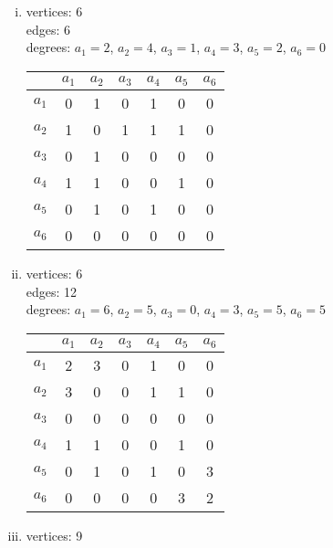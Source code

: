 \documentclass{article}
\begin{document}
\section{}
\begin{enumerate}[i)]
\item
vertices: 6\\
edges: 6\\
degrees: $a_1=2$, $a_2=4$, $a_3=1$, $a_4=3$, $a_5=2$, $a_6=0$
\begin{table}[!h]
\begin{center}
\begin{tabular}{c|cccccc}
	 &$a_1$&$a_2$&$a_3$&$a_4$&$a_5$&$a_6$\\ \hline
$a_1$&	0  &  1  &  0  &  1  &  0  &  0  \\
$a_2$&	1  &  0  &  1  &  1  &  1  &  0  \\
$a_3$&	0  &  1  &  0  &  0  &  0  &  0  \\
$a_4$&	1  &  1  &  0  &  0  &  1  &  0  \\
$a_5$&	0  &  1  &  0  &  1  &  0  &  0  \\
$a_6$&	0  &  0  &  0  &  0  &  0  &  0  \\
\end{tabular}
\end{center}
\end{table}
\newpage
\item
vertices: 6\\
edges: 12\\
degrees: $a_1=6$, $a_2=5$, $a_3=0$, $a_4=3$, $a_5=5$, $a_6=5$
\begin{table}[!h]
\begin{center}
\begin{tabular}{c|cccccc}
	 &$a_1$&$a_2$&$a_3$&$a_4$&$a_5$&$a_6$\\ \hline
$a_1$&	2  &  3  &  0  &  1  &  0  &  0  \\
$a_2$&	3  &  0  &  0  &  1  &  1  &  0  \\
$a_3$&	0  &  0  &  0  &  0  &  0  &  0  \\
$a_4$&	1  &  1  &  0  &  0  &  1  &  0  \\
$a_5$&	0  &  1  &  0  &  1  &  0  &  3  \\
$a_6$&	0  &  0  &  0  &  0  &  3  &  2  \\
\end{tabular}
\end{center}
\end{table}
\item
vertices: 9\\

\end{enumerate}
\end{document}
